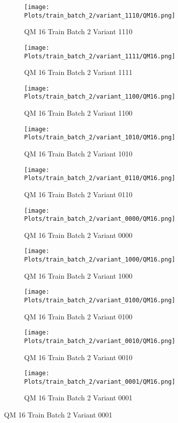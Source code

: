 \documentclass{DissertateFigs}
\begin{document}
\begin{figure}[t!]
    \begin{subfigure}{0.33\textwidth}
    \texttt{[image: Plots/train\_batch\_2/variant\_1110/QM16.png]}
    \caption{QM 16 Train Batch 2 Variant 1110}
    \end{subfigure}
    \begin{subfigure}{0.33\textwidth}
    \texttt{[image: Plots/train\_batch\_2/variant\_1111/QM16.png]}
    \caption{QM 16 Train Batch 2 Variant 1111}
    \end{subfigure}

\medskip

    \begin{subfigure}{0.33\textwidth}
    \texttt{[image: Plots/train\_batch\_2/variant\_1100/QM16.png]}
    \caption{QM 16 Train Batch 2 Variant 1100}
    \end{subfigure}
    \begin{subfigure}{0.33\textwidth}
    \texttt{[image: Plots/train\_batch\_2/variant\_1010/QM16.png]}
    \caption{QM 16 Train Batch 2 Variant 1010}
    \end{subfigure}

\medskip

    \begin{subfigure}{0.33\textwidth}
    \texttt{[image: Plots/train\_batch\_2/variant\_0110/QM16.png]}
    \caption{QM 16 Train Batch 2 Variant 0110}
    \end{subfigure}
    \begin{subfigure}{0.33\textwidth}
    \texttt{[image: Plots/train\_batch\_2/variant\_0000/QM16.png]}
    \caption{QM 16 Train Batch 2 Variant 0000}
    \end{subfigure}

\medskip

    \begin{subfigure}{0.33\textwidth}
    \texttt{[image: Plots/train\_batch\_2/variant\_1000/QM16.png]}
    \caption{QM 16 Train Batch 2 Variant 1000}
    \end{subfigure}
    \begin{subfigure}{0.33\textwidth}
    \texttt{[image: Plots/train\_batch\_2/variant\_0100/QM16.png]}
    \caption{QM 16 Train Batch 2 Variant 0100}
    \end{subfigure}

\medskip

    \begin{subfigure}{0.33\textwidth}
    \texttt{[image: Plots/train\_batch\_2/variant\_0010/QM16.png]}
    \caption{QM 16 Train Batch 2 Variant 0010}
    \end{subfigure}
    \begin{subfigure}{0.33\textwidth}
    \texttt{[image: Plots/train\_batch\_2/variant\_0001/QM16.png]}
    \caption{QM 16 Train Batch 2 Variant 0001}
    \end{subfigure}


\end{figure}
\end{document}
